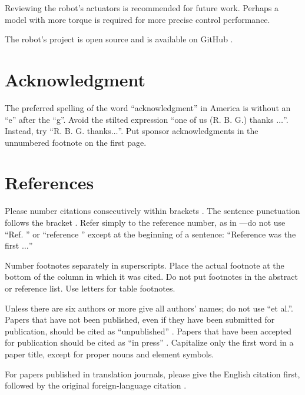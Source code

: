 \documentclass[conference]{IEEEtran}
\begin{document}
Reviewing the robot's actuators is recommended for future work. Perhaps a model with more torque is required for more precise control performance.

The robot's project is open source and is available on GitHub \cite{CaramelRepo}.

\section*{Acknowledgment}

The preferred spelling of the word ``acknowledgment'' in America is without
an ``e'' after the ``g''. Avoid the stilted expression ``one of us (R. B.
G.) thanks $\ldots$''. Instead, try ``R. B. G. thanks$\ldots$''. Put sponsor
acknowledgments in the unnumbered footnote on the first page.

\section*{References}

Please number citations consecutively within brackets \cite{b1}. The
sentence punctuation follows the bracket \cite{b2}. Refer simply to the reference
number, as in \cite{b3}---do not use ``Ref. \cite{b3}'' or ``reference \cite{b3}'' except at
the beginning of a sentence: ``Reference \cite{b3} was the first $\ldots$''

Number footnotes separately in superscripts. Place the actual footnote at
the bottom of the column in which it was cited. Do not put footnotes in the
abstract or reference list. Use letters for table footnotes.

Unless there are six authors or more give all authors' names; do not use
``et al.''. Papers that have not been published, even if they have been
submitted for publication, should be cited as ``unpublished'' \cite{b4}. Papers
that have been accepted for publication should be cited as ``in press'' \cite{b5}.
Capitalize only the first word in a paper title, except for proper nouns and
element symbols.

For papers published in translation journals, please give the English
citation first, followed by the original foreign-language citation \cite{b6}.
\end{document}
